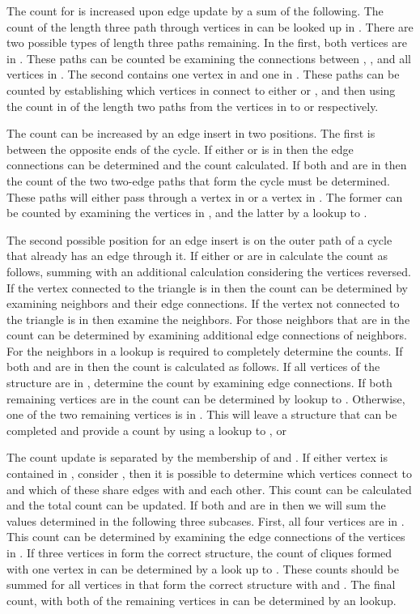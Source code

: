 \documentclass[11pt]{article}
\begin{document}
The count for  is increased upon edge update by a sum of the following.  The count of the length three path through vertices in  can be looked up in .  There are two possible types of length three paths remaining.  In the first, both vertices are in .  These paths can be counted be examining the connections between , , and all vertices in .  The second contains one vertex in  and one in . These paths can be counted by establishing which vertices in  connect to either  or , and then using the count in  of the length two paths from the vertices in  to  or  respectively.



The  count can be increased by an edge insert in two positions.  The first is between the opposite ends of the cycle.  If either  or  is in  then the edge connections can be determined and the count calculated.  If both  and  are in  then the count of the two two-edge paths that form the cycle must be determined.  These paths will either pass through a vertex in  or a vertex in .  The former can be counted by examining the vertices in , and the latter by a lookup to .

The second possible position for an edge insert is on the outer path of a cycle that already has an edge through it.  If either  or  are in  calculate the count as follows, summing with an additional calculation considering the vertices reversed. If the vertex connected to the triangle is in  then the count can be determined by examining neighbors and their edge connections.  If the vertex not connected to the triangle is in  then examine the neighbors.  For those neighbors that are in  the count can be determined by examining additional edge connections of neighbors.  For the neighbors in  a lookup  is required to completely determine the counts.  If both  and  are in  then the count is calculated as follows. If all vertices of the structure are in , determine the count by examining edge connections.  If both remaining vertices are in  the count can be determined by lookup to .  Otherwise, one of the two remaining vertices is in .  This will leave a structure that can be completed and provide a count by using a lookup to , or 


The  count update is separated by the membership of  and .  If either vertex is contained in , consider , then it is possible to determine which vertices connect to  and which of these share edges with  and each other.  This count can be calculated and the total count can be updated.  If both  and  are in  then we will sum the values determined in the following three subcases.  First, all four vertices are in .  This count can be determined by examining the edge connections of the vertices in .  If three vertices in  form the correct structure, the count of cliques formed with one vertex in  can be determined by a look up to .  These counts should be summed for all vertices in  that form the correct structure with  and .  The final count, with both of the remaining vertices in  can be determined by an  lookup.
\end{document}
